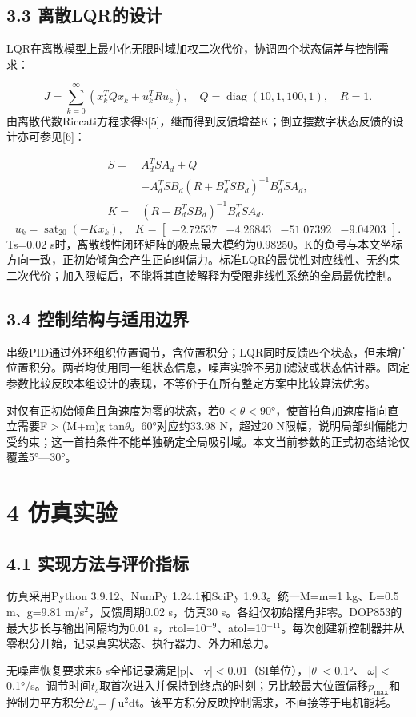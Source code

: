 \documentclass[UTF8,a4paper,fontset=fandol,zihao=5]{ctexart}
\begin{document}
\subsection*{3.3 离散LQR的设计}
LQR在离散模型上最小化无限时域加权二次代价，协调四个状态偏差与控制需求：\par
\[
J=\sum_{k=0}^{\infty}(x_k^TQx_k+u_k^TRu_k),\quad Q=\operatorname{diag}(10,1,100,1),\quad R=1.
\]
由离散代数Riccati方程求得S[5]，继而得到反馈增益K；倒立摆数字状态反馈的设计亦可参见[6]：\par
\[
\begin{aligned}S=&A_d^TSA_d+Q\\&-A_d^TSB_d(R+B_d^TSB_d)^{-1}B_d^TSA_d,\\K=&(R+B_d^TSB_d)^{-1}B_d^TSA_d.\end{aligned}
\]
\[
u_k=\operatorname{sat}_{20}(-Kx_k),\quad K=\begin{bmatrix}-2.72537&-4.26843&-51.07392&-9.04203\end{bmatrix}.
\]
Ts=0.02 s时，离散线性闭环矩阵的极点最大模约为0.98250。K的负号与本文坐标方向一致，正初始倾角会产生正向纠偏力。标准LQR的最优性对应线性、无约束二次代价；加入限幅后，不能将其直接解释为受限非线性系统的全局最优控制。\par
\subsection*{3.4 控制结构与适用边界}
串级PID通过外环组织位置调节，含位置积分；LQR同时反馈四个状态，但未增广位置积分。两者均使用同一组状态信息，噪声实验不另加滤波或状态估计器。固定参数比较反映本组设计的表现，不等价于在所有整定方案中比较算法优劣。\par
对仅有正初始倾角且角速度为零的状态，若0$<$$\theta$$<$90°，使首拍角加速度指向直立需要F$>$(M+m)g tan$\theta$。60°对应约33.98 N，超过20 N限幅，说明局部纠偏能力受约束；这一首拍条件不能单独确定全局吸引域。本文当前参数的正式初态结论仅覆盖5°—30°。\par
\newpage
\section*{4 仿真实验}
\subsection*{4.1 实现方法与评价指标}
仿真采用Python 3.9.12、NumPy 1.24.1和SciPy 1.9.3。统一M=m=1 kg、L=0.5 m、g=9.81 m/s$^2$，反馈周期0.02 s，仿真30 s。各组仅初始摆角非零。DOP853的最大步长与输出间隔均为0.01 s，rtol=10$^{-9}$、atol=10$^{-11}$。每次创建新控制器并从零积分开始，记录真实状态、执行器力、外力和总力。\par
无噪声恢复要求末5 s全部记录满足|p|、|v|$<$0.01（SI单位），|$\theta$|$<$0.1°、|$\omega$|$<$0.1°/s。调节时间$t_s$取首次进入并保持到终点的时刻；另比较最大位置偏移$p_{\max}$和控制力平方积分$E_u$=$\int$u$^2$dt。该平方积分反映控制需求，不直接等于电机能耗。\par
\end{document}
